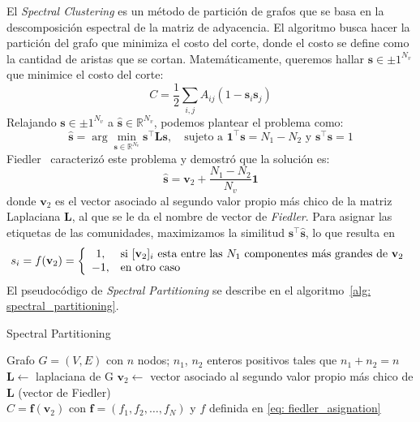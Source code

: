 \documentclass{article}
\begin{document}
El \emph{Spectral Clustering} es un método de partición de grafos que se basa en la descomposición espectral de la matriz de adyacencia. El algoritmo busca hacer la partición del grafo que minimiza el costo del corte, donde el costo se define como la cantidad de aristas que se cortan. Matemáticamente, queremos hallar $\mathbf{s}\in{\pm 1}^{N_v}$ que minimice el costo del corte:
\begin{equation*}
    C = \frac{1}{2} \sum_{i,j} A_{ij} (1 - \mathbf{s}_i \mathbf{s}_j)
\end{equation*}
Relajando $\mathbf{s}\in{\pm 1}^{N_v}$ a $\mathbf{\hat{s}}\in{\mathbb{R}}^{N_v}$, podemos plantear el problema como:
\begin{equation*}
    \mathbf{\hat{s}} = \arg \min_{\mathbf{s}\in{\mathbb{R}}^{N_v}} \mathbf{s}^\top \mathbf{L} \mathbf{s}, \quad \text{sujeto a } \mathbf{1}^\top \mathbf{s} = N_1 - N_2 \text{ y } \mathbf{s}^\top \mathbf{s} = 1
\end{equation*}
Fiedler~\cite{Fiedler1973} caracterizó este problema y demostró que la solución es:
\begin{equation*}
    \mathbf{\hat{s}} = \mathbf{v}_2 + \frac{N_1 - N_2}{N_v} \mathbf{1}
\end{equation*}
donde $\mathbf{v}_2$ es el vector asociado al segundo valor propio más chico de la matriz Laplaciana $\mathbf{L}$, al que se le da el nombre de vector de \emph{Fiedler}. Para asignar las
etiquetas de las comunidades, maximizamos la similitud $\mathbf{s}^\top\mathbf{\hat{s}}$, lo que resulta en
\begin{equation}
    \label{eq: fiedler_asignation}
    s_i = f(\mathbf{v}_2) = \left\lbrace 
    \begin{array}{c l}
         1, & \text{si } [\mathbf{v}_2]_i \text{ esta entre las $N_1$ componentes más grandes de $\mathbf{v}_2$} \\
        -1, & \text{en otro caso}
    \end{array}\right.
\end{equation}
El pseudocódigo de \emph{Spectral Partitioning} se describe en el algoritmo~\ref{alg: spectral_partitioning}.
\begin{algorithm}
    \caption{Spectral Partitioning}
    \label{alg: spectral_partitioning}
    \begin{algorithmic}
    \Require Grafo $G = (V, E)$ con $n$ nodos; $n_1$, $n_2$ enteros positivos tales que $n_1 + n_2 = n$
    \State  $\mathbf{L} \leftarrow $ laplaciana de G
    \State $\mathbf{v}_2 \leftarrow $ vector asociado al segundo valor propio más chico de $\mathbf{L}$ (vector de Fiedler)\\ 
    \Return $C = \mathbf{f}(\mathbf{v}_2)$ con $\mathbf{f}=(f_1,f_2,\ldots,f_N)$ y $f$ definida en \eqref{eq: fiedler_asignation}
    \end{algorithmic}
\end{algorithm}
\end{document}
